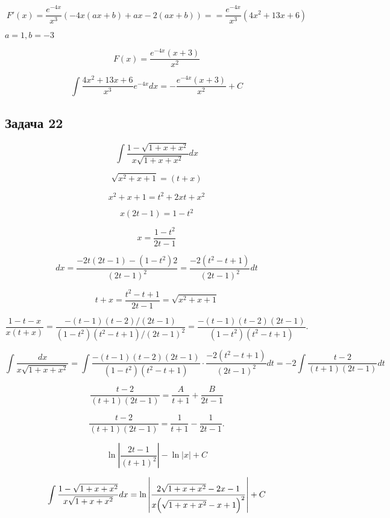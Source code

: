 \documentclass[a4paper,12pt]{article}
\begin{document}
\[
    F'(x)=\frac{e^{-4x}}{x^3}\left(-4x(ax+b) + ax - 2(ax+b)\right) == \frac{e^{-4x}}{x^3}(4x^2+13x+6)
\]

$a=1, b=-3$

\[
F(x) = \frac{e^{-4x}(x+3)}{x^2}
\]

\[
    \int \frac{4x^2+13x+6}{x^3} e^{-4x} dx = -\frac{e^{-4x}(x+3)}{x^2} + C
\]

\subsection{Задача 22}
\[
\int \frac{1-\sqrt{1+x+x^2}}{x\sqrt{1+x+x^2}}dx
\]

\[
\sqrt{x^2+x+1} = (t + x)
\]

\[
x^2+x+1=t^2+2xt+x^2
\]

\[
x(2t-1)=1-t^2
\]

\[
x = \frac{1-t^2}{2t-1}
\]

\[
dx = \frac{-2t(2t-1)-(1-t^2)2}{(2t-1)^2} = \frac{-2(t^2-t+1)}{(2t-1)^2}dt
\]

\[
t+x = \frac{t^2-t+1}{2t-1} = \sqrt{x^2+x+1}
\]

\[
    \frac{1-t-x}{x(t+x)}
    =\frac{-  (t-1)(t-2)/(2t-1)}{(1-t^2)(t^2-t+1)/(2t-1)^2}
    =\frac{-  (t-1)(t-2)(2t-1)}{(1-t^2)(t^2-t+1)}.
\]

\[
    \int\frac{dx}{x\sqrt{1+x+x^2}}
    =\int \frac{- (t-1)(t-2)(2t-1)}{(1-t^2)(t^2-t+1)}\cdot\frac{-2(t^2-t+1)}{(2t-1)^2}  dt = -2\int \frac{t-2}{(t+1)(2t-1)}dt
\]

\[
\frac{t-2}{(t+1)(2t-1)}=\frac{A}{t+1}+\frac{B}{2t-1}
\]

\[
\frac{t-2}{(t+1)(2t-1)}=\frac{1}{t+1}-\frac{1}{2t-1}.
\]

\[
    \ln\left|\frac{2t-1}{(t+1)^2}\right|-\ln|x|+C
\]

\[
    \int \frac{1-\sqrt{1+x+x^2}}{x\sqrt{1+x+x^2}}dx
    =\ln\left|\frac{2\sqrt{1+x+x^2}-2x-1}{x\Bigl(\sqrt{1+x+x^2}-x+1\Bigr)^2}\right|+C
\]
\end{document}
